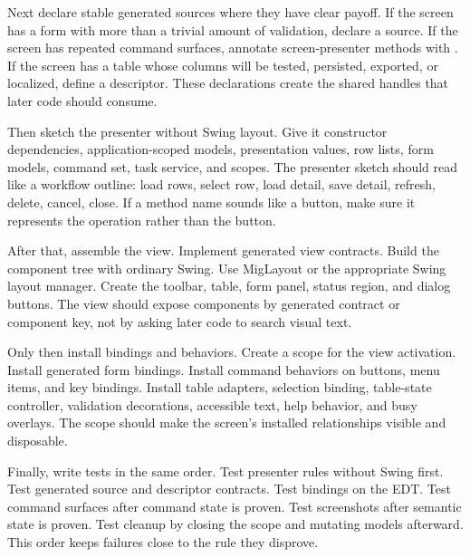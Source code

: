 Next declare stable generated sources where they have clear payoff. If the screen has a form with more than a trivial amount of validation, declare a  source. If the screen has repeated command surfaces, annotate screen-presenter methods with . If the screen has a table whose columns will be tested, persisted, exported, or localized, define a descriptor. These declarations create the shared handles that later code should consume.

Then sketch the presenter without Swing layout. Give it constructor dependencies, application-scoped models, presentation values, row lists, form models, command set, task service, and scopes. The presenter sketch should read like a workflow outline: load rows, select row, load detail, save detail, refresh, delete, cancel, close. If a method name sounds like a button, make sure it represents the operation rather than the button.

After that, assemble the view. Implement generated view contracts. Build the component tree with ordinary Swing. Use MigLayout or the appropriate Swing layout manager. Create the toolbar, table, form panel, status region, and dialog buttons. The view should expose components by generated contract or component key, not by asking later code to search visual text.

Only then install bindings and behaviors. Create a scope for the view activation. Install generated form bindings. Install command behaviors on buttons, menu items, and key bindings. Install table adapters, selection binding, table-state controller, validation decorations, accessible text, help behavior, and busy overlays. The scope should make the screen's installed relationships visible and disposable.

Finally, write tests in the same order. Test presenter rules without Swing first. Test generated source and descriptor contracts. Test bindings on the EDT. Test command surfaces after command state is proven. Test screenshots after semantic state is proven. Test cleanup by closing the scope and mutating models afterward. This order keeps failures close to the rule they disprove.

